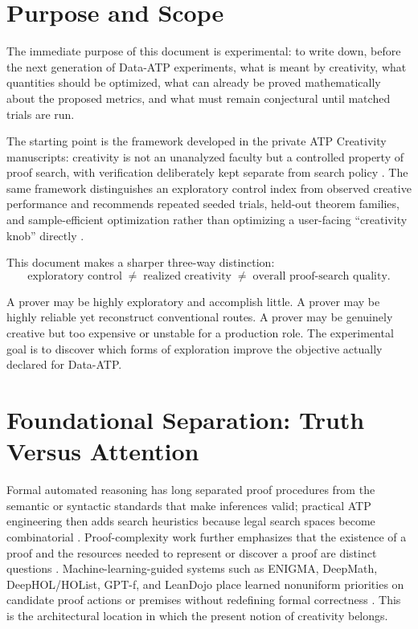 \documentclass[11pt]{article}
\theoremstyle{datatheorem}
\theoremstyle{definition}
\begin{document}
\section{Purpose and Scope}

The immediate purpose of this document is experimental: to write down, before the next generation of Data-ATP experiments, what is meant by creativity, what quantities should be optimized, what can already be proved mathematically about the proposed metrics, and what must remain conjectural until matched trials are run.

The starting point is the framework developed in the private ATP Creativity manuscripts: creativity is not an unanalyzed faculty but a controlled property of proof search, with verification deliberately kept separate from search policy \cite{tennesonC1,tennesonC2,tennesonCombined}. The same framework distinguishes an exploratory control index from observed creative performance and recommends repeated seeded trials, held-out theorem families, and sample-efficient optimization rather than optimizing a user-facing ``creativity knob'' directly \cite{tennesonC2,tennesonCombined}.

This document makes a sharper three-way distinction:
\[
\boxed{
\text{exploratory control}
\;\neq\;
\text{realized creativity}
\;\neq\;
\text{overall proof-search quality}.}
\]

A prover may be highly exploratory and accomplish little. A prover may be highly reliable yet reconstruct conventional routes. A prover may be genuinely creative but too expensive or unstable for a production role. The experimental goal is to discover which forms of exploration improve the objective actually declared for Data-ATP.

\section{Foundational Separation: Truth Versus Attention}

Formal automated reasoning has long separated proof procedures from the semantic or syntactic standards that make inferences valid; practical ATP engineering then adds search heuristics because legal search spaces become combinatorial \cite{fitting1996,harrison2009}. Proof-complexity work further emphasizes that the existence of a proof and the resources needed to represent or discover a proof are distinct questions \cite{cookreckhow1979}. Machine-learning-guided systems such as ENIGMA, DeepMath, DeepHOL/HOList, GPT-f, and LeanDojo place learned nonuniform priorities on candidate proof actions or premises without redefining formal correctness \cite{jakubuv2017,alemi2016,bansal2019,polu2020,yang2023}. This is the architectural location in which the present notion of creativity belongs.
\end{document}
